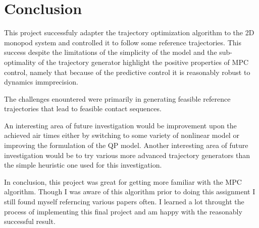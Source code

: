 \documentclass[conference]{IEEEtran}
\begin{document}
\section{Conclusion}
\label{sec:conclusion}

This project successfuly adapter the trajectory optimization algorithm to the 2D monopod system and controlled it to follow some reference trajectories.
This success despite the limitations of the simplicity of the model and the sub-optimality of the trajectory generator highlight the positive properties of MPC control, namely that because of the predictive control it is reasonably robust to dynamics immprecision.

The challenges enountered were primarily in generating feasible reference trajectories that lead to feasible contact sequences.

An interesting area of future investigation would be improvement upon the achieved air times either by switching to some variety of nonlinear model or improving the formulation of the QP model.
Another interesting area of future investigation would be to try various more advanced trajectory generators than the simple heuristic one used for this investigation.

In conclusion, this project was great for getting more familiar with the MPC algorithm.
Though I was aware of this algorithm prior to doing this assignment I still found myself referncing various papers often.
I learned a lot throught the process of implementing this final project and am happy with the reasonably successful result.



\end{document}
